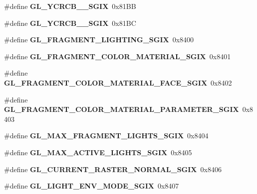\begin{DoxyCompactItemize}
\item 
\#define {\bfseries G\+L\+\_\+\+Y\+C\+R\+C\+B\+\_\+\_\+\+S\+G\+I\+X}~0x81\+B\+B\label{_s_d_l__opengl_8h_a936fdc2fc74365f057ad02dc0f10f2c2}

\item 
\#define {\bfseries G\+L\+\_\+\+Y\+C\+R\+C\+B\+\_\+\_\+\+S\+G\+I\+X}~0x81\+B\+C\label{_s_d_l__opengl_8h_ae80a056419c6047cab98acb0835518fe}

\item 
\#define {\bfseries G\+L\+\_\+\+F\+R\+A\+G\+M\+E\+N\+T\+\_\+\+L\+I\+G\+H\+T\+I\+N\+G\+\_\+\+S\+G\+I\+X}~0x8400\label{_s_d_l__opengl_8h_ab713f1be2f111c602113ea970ae66fa7}

\item 
\#define {\bfseries G\+L\+\_\+\+F\+R\+A\+G\+M\+E\+N\+T\+\_\+\+C\+O\+L\+O\+R\+\_\+\+M\+A\+T\+E\+R\+I\+A\+L\+\_\+\+S\+G\+I\+X}~0x8401\label{_s_d_l__opengl_8h_a483b074b4a50a9e9b2a8e5390efea9fd}

\item 
\#define {\bfseries G\+L\+\_\+\+F\+R\+A\+G\+M\+E\+N\+T\+\_\+\+C\+O\+L\+O\+R\+\_\+\+M\+A\+T\+E\+R\+I\+A\+L\+\_\+\+F\+A\+C\+E\+\_\+\+S\+G\+I\+X}~0x8402\label{_s_d_l__opengl_8h_aa62f0c6558977834352e1034157b02ed}

\item 
\#define {\bfseries G\+L\+\_\+\+F\+R\+A\+G\+M\+E\+N\+T\+\_\+\+C\+O\+L\+O\+R\+\_\+\+M\+A\+T\+E\+R\+I\+A\+L\+\_\+\+P\+A\+R\+A\+M\+E\+T\+E\+R\+\_\+\+S\+G\+I\+X}~0x8403\label{_s_d_l__opengl_8h_a808b673ee618df74ca5134c2578d03f1}

\item 
\#define {\bfseries G\+L\+\_\+\+M\+A\+X\+\_\+\+F\+R\+A\+G\+M\+E\+N\+T\+\_\+\+L\+I\+G\+H\+T\+S\+\_\+\+S\+G\+I\+X}~0x8404\label{_s_d_l__opengl_8h_a8d2ee309cf0807c7d53d7f3f4c652170}

\item 
\#define {\bfseries G\+L\+\_\+\+M\+A\+X\+\_\+\+A\+C\+T\+I\+V\+E\+\_\+\+L\+I\+G\+H\+T\+S\+\_\+\+S\+G\+I\+X}~0x8405\label{_s_d_l__opengl_8h_a0c3985dbc391d68a2707c1d9c3d39677}

\item 
\#define {\bfseries G\+L\+\_\+\+C\+U\+R\+R\+E\+N\+T\+\_\+\+R\+A\+S\+T\+E\+R\+\_\+\+N\+O\+R\+M\+A\+L\+\_\+\+S\+G\+I\+X}~0x8406\label{_s_d_l__opengl_8h_a7d11ea01a40b36021ee01d8a7b29a5ea}

\item 
\#define {\bfseries G\+L\+\_\+\+L\+I\+G\+H\+T\+\_\+\+E\+N\+V\+\_\+\+M\+O\+D\+E\+\_\+\+S\+G\+I\+X}~0x8407\label{_s_d_l__opengl_8h_a0e667a6a846cb576118b2753402c7352}


\end{DoxyCompactItemize}
